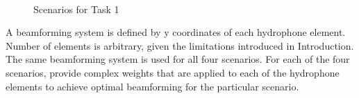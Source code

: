 \documentclass{article}
\begin{document}
\begin{figure}[h!]
	\centering
	\hfill
	\\
	\hfill
	\caption{Scenarios for Task 1}
\end{figure}

A beamforming system is defined by y coordinates of each hydrophone element. 
Number of elements is arbitrary, given the limitations introduced in 
Introduction. The same beamforming system is used for all four scenarios. For 
each of the four scenarios, provide complex weights that are applied to each of 
the hydrophone elements to achieve optimal beamforming for the particular 
scenario.
\end{document}

